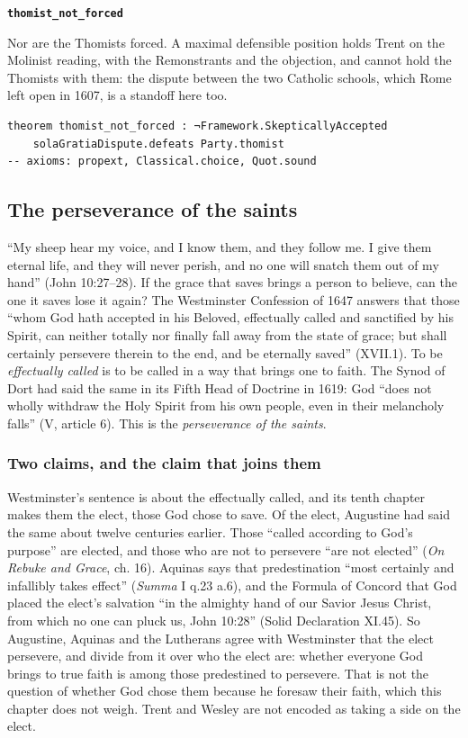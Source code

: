 \documentclass[11pt]{article}
\begin{document}
\par\medskip\noindent\textbf{\texttt{thomist\_\allowbreak{}not\_\allowbreak{}forced}}\par\nobreak\noindent
Nor are the Thomists forced. A maximal defensible position holds Trent on the Molinist reading, with the Remonstrants and the objection, and cannot hold the Thomists with them: the dispute between the two Catholic schools, which Rome left open in 1607, is a standoff here too.

{\small\begin{verbatim}
theorem thomist_not_forced : ¬Framework.SkepticallyAccepted
    solaGratiaDispute.defeats Party.thomist
-- axioms: propext, Classical.choice, Quot.sound
\end{verbatim}}
\subsection*{The perseverance of the saints}
“My sheep hear my voice, and I know them, and they follow me. I give them eternal life, and they will never perish, and no one will snatch them out of my hand” (John 10:27–28). If the grace that saves brings a person to believe, can the one it saves lose it again? The Westminster Confession of 1647 answers that those “whom God hath accepted in his Beloved, effectually called and sanctified by his Spirit, can neither totally nor finally fall away from the state of grace; but shall certainly persevere therein to the end, and be eternally saved” (XVII.1). To be \emph{effectually called} is to be called in a way that brings one to faith. The Synod of Dort had said the same in its Fifth Head of Doctrine in 1619: God “does not wholly withdraw the Holy Spirit from his own people, even in their melancholy falls” (V, article 6). This is the \emph{perseverance of the saints}.

\subsubsection*{Two claims, and the claim that joins them}
Westminster’s sentence is about the effectually called, and its tenth chapter makes them the elect, those God chose to save. Of the elect, Augustine had said the same about twelve centuries earlier. Those “called according to God’s purpose” are elected, and those who are not to persevere “are not elected” (\emph{On Rebuke and Grace}, ch. 16). Aquinas says that predestination “most certainly and infallibly takes effect” (\emph{Summa} I q.23 a.6), and the Formula of Concord that God placed the elect’s salvation “in the almighty hand of our Savior Jesus Christ, from which no one can pluck us, John 10:28” (Solid Declaration XI.45). So Augustine, Aquinas and the Lutherans agree with Westminster that the elect persevere, and divide from it over who the elect are: whether everyone God brings to true faith is among those predestined to persevere. That is not the question of whether God chose them because he foresaw their faith, which this chapter does not weigh. Trent and Wesley are not encoded as taking a side on the elect.
\end{document}
